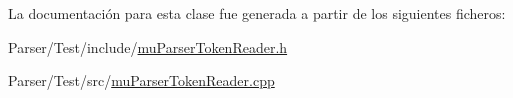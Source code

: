 La documentación para esta clase fue generada a partir de los siguientes ficheros\+:\begin{DoxyCompactItemize}
\item 
Parser/\+Test/include/\hyperlink{mu_parser_token_reader_8h}{mu\+Parser\+Token\+Reader.\+h}\item 
Parser/\+Test/src/\hyperlink{mu_parser_token_reader_8cpp}{mu\+Parser\+Token\+Reader.\+cpp}\end{DoxyCompactItemize}
